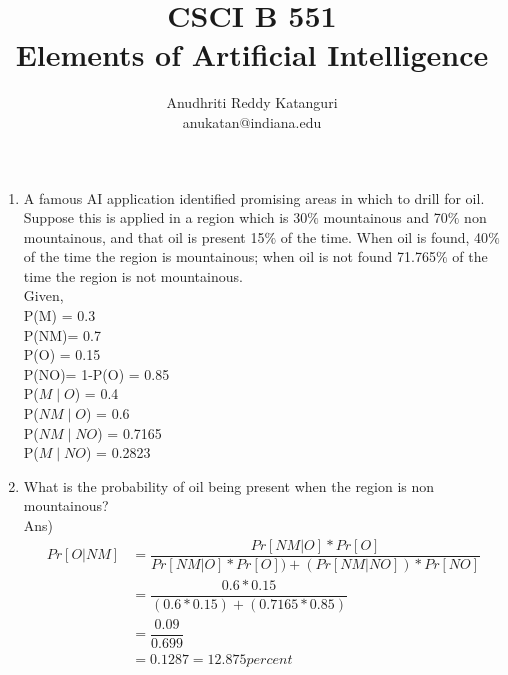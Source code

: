 \documentclass[11pt]{article}
\begin{document}
\title{ CSCI B 551 \\
Elements of Artificial Intelligence }
\author{Anudhriti Reddy Katanguri \\
           anukatan@indiana.edu}
\maketitle

\begin{enumerate}
\item A famous AI application identified promising areas in which to drill for oil. Suppose this is applied in a region which is 30$\%$ mountainous and 70$\%$ non mountainous, and that oil is present 15$\%$ of the time. When oil is found, 40$\%$ of the time the region is mountainous; when oil is not found 71.765$\%$ of the time the region is not mountainous. \\

Given, \\
P(M) = 0.3 \\
P(NM)= 0.7 \\
P(O) = 0.15 \\
P(NO)= 1-P(O) = 0.85\\
P(${M}\mid{O}$) = 0.4 \\
P(${NM}\mid{O}$) = 0.6 \\
P(${NM}\mid{NO}$) = 0.7165 \\
P(${M}\mid{NO}$) = 0.2823 \\

\item What is the probability of oil being present when the region is non mountainous? \\
Ans)\begin{align*}
 Pr[O|NM]&=\dfrac{Pr[NM|O]*Pr[O]}{Pr[NM|O]*Pr[O])+(Pr[NM|NO])*Pr[NO]}\\
 &= \dfrac{0.6 * 0.15}{(0.6*0.15)+(0.7165*0.85)} \\
 &= \dfrac{0.09}{0.699} \\
 &= 0.1287 = 12.875 percent 
 \end{align*}


\end{enumerate}
\end{document}
